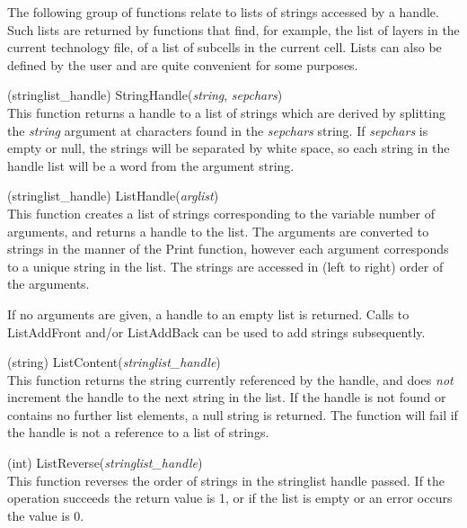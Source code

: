 The following group of functions relate to lists of strings accessed by
a handle.  Such lists are returned by functions that find, for
example, the list of layers in the current technology file, of a list
of subcells in the current cell.  Lists can also be defined by the
user and are quite convenient for some purposes.

\begin{description}
\item{(stringlist\_handle) \vt StringHandle({\it string\/},
 {\it sepchars\/})}\\
This function returns a handle to a list of strings which are derived
by splitting the {\it string} argument at characters found in the {\it
sepchars} string.  If {\it sepchars} is empty or null, the strings
will be separated by white space, so each string in the handle list
will be a word from the argument string.

\item{(stringlist\_handle) \vt ListHandle({\it arglist\/})}\\
This function creates a list of strings corresponding to the variable
number of arguments, and returns a handle to the list.  The arguments
are converted to strings in the manner of the {\vt Print} function,
however each argument corresponds to a unique string in the list.  The
strings are accessed in (left to right) order of the arguments.

If no arguments are given, a handle to an empty list is returned. 
Calls to {\vt ListAddFront} and/or {\vt ListAddBack} can be used to
add strings subsequently.

\item{(string) \vt ListContent({\it stringlist\_handle\/})}\\
This function returns the string currently referenced by the handle,
and does {\it not} increment the handle to the next string in the
list.  If the handle is not found or contains no further list
elements, a null string is returned.  The function will fail if the
handle is not a reference to a list of strings.

\item{(int) \vt ListReverse({\it stringlist\_handle\/})}\\
This function reverses the order of strings in the stringlist handle
passed.  If the operation succeeds the return value is 1, or if the
list is empty or an error occurs the value is 0.



\end{description}
